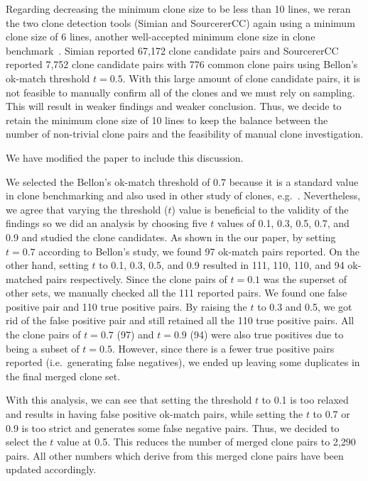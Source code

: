 \documentclass[a4paper,twoside,10pt]{reviewresponse}
\begin{document}
Regarding decreasing the minimum clone size to be less than 10 lines, we reran the two clone detection tools (Simian and SourcererCC) again using a minimum clone size of 6 lines, another well-accepted minimum clone size in clone benchmark~\citep{Bellon2007}. Simian reported 67,172 clone candidate pairs and SourcererCC reported 7,752 clone candidate pairs with 776 common clone pairs using Bellon's ok-match threshold $t=0.5$. With this large amount of clone candidate pairs, it is not feasible to manually confirm all of the clones and we must rely on sampling. This will result in weaker findings and weaker conclusion. Thus, we decide to retain the minimum clone size of 10 lines to keep the balance between the number of non-trivial clone pairs and the feasibility of manual clone investigation.

We have modified the paper to include this discussion.


We selected the Bellon's ok-match threshold of 0.7 because it is a standard value in clone benchmarking \citep{Bellon2007} and also used in other study of clones, e.g.~\cite{Sajnani2016}. Nevertheless, we agree that varying the threshold ($t$) value is beneficial to the validity of the findings so we did an analysis by choosing five $t$ values of 0.1, 0.3, 0.5, 0.7, and 0.9 and studied the clone candidates. As shown in the our paper, by setting $t=0.7$ according to Bellon's study, we found 97 ok-match pairs reported. On the other hand, setting $t$ to 0.1, 0.3, 0.5, and 0.9 resulted in 111, 110, 110, and 94 ok-matched pairs respectively.
Since the clone pairs of $t=0.1$ was the superset of other sets,  we manually checked all the 111 reported pairs.
We found one false positive pair and 110 true positive pairs. By raising the $t$ to 0.3 and 0.5, we got rid of the false positive pair and still retained all the 110 true positive pairs. All the clone pairs of $t=0.7$ (97) and $t=0.9$ (94) were also true positives due to being a subset of $t=0.5$. However, since there is a fewer true positive pairs reported (i.e.~generating false negatives), we ended up leaving some duplicates in the final merged clone set.

With this analysis, we can see that setting the threshold $t$ to 0.1 is too relaxed and results in having false positive ok-match pairs, while setting the $t$ to 0.7 or 0.9 is too strict and generates some false negative pairs. Thus, we decided to select the $t$ value at 0.5. This reduces the number of merged clone pairs to 2,290 pairs. All other numbers which derive from this merged clone pairs have been updated accordingly.
\end{document}
